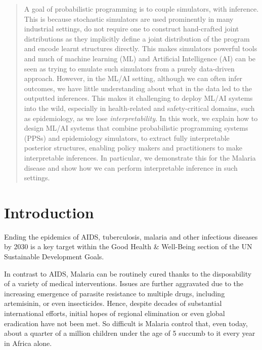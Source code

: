 \documentclass{article}
\begin{document}
\printAffiliationsAndNotice{\icmlEqualContribution} %

\begin{abstract}

A goal of probabilistic programming is to couple simulators, with inference. This is 
because stochastic simulators are used prominently in many industrial settings,
do not require one to construct hand-crafted joint distributions as they implicitly 
define a joint distribution of the program and encode learnt structures 
directly. This makes simulators powerful tools and much of machine learning (ML) and 
Artificial Intelligence (AI)
can be seen as trying to emulate such simulators from a purely data-driven approach.
However, in the 
ML/AI setting, although we can often infer outcomes, we have little understanding about what 
in the data led to the outputted inferences. 
This makes it challenging to deploy ML/AI systems into the wild, especially in health-related and safety-critical domains, such
as epidemiology, as we lose \emph{interpretability}. 
In this work, we explain how to design ML/AI systems that combine
probabilistic programming systems (PPSs) and epidemiology simulators, to extract
fully interpretable posterior structures, enabling policy makers 
and practitioners to make interpretable inferences. 
In particular, we demonstrate this for the Malaria disease and show how we can 
perform interpretable inference in such settings.
\end{abstract}

\section{Introduction}
Ending the epidemics of AIDS, tuberculosis, malaria and other infectious diseases by 2030 is a key target within the Good Health \& Well-Being section of the UN Sustainable Development Goals\cite{}. 

In contrast to AIDS, Malaria can be routinely cured thanks to the disposability of a variety of medical interventions. 
Issues are further aggravated due to the increasing emergence of parasite resistance to multiple drugs, including artemisinin, or even insecticides. Hence, despite decades of substantial international efforts, initial hopes of regional elimination or even global eradication have not been met. So difficult is Malaria control that, even today, about a quarter of a million children under the age of 5 succumb to it every year in Africa alone. 
\end{document}
